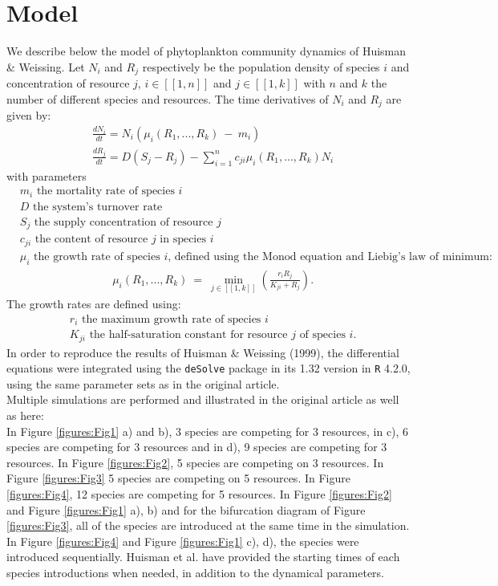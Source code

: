 \section{Model}
We describe below the model of phytoplankton community dynamics of Huisman \& Weissing\supercite{1999:Huisman}.
Let $N_i$ and $R_j$ respectively be the population density of species $i$ and concentration of resource 
$j$, $i\in[\![1,n]\!]$ and $j\in[\![1,k]\!]$ with $n$ and $k$ the number of 
different species and resources. The time derivatives of $N_i$ and $R_j$ are 
given by: \\
\begin{align}
	& \frac{dN_i}{dt}= N_i(\mu_i(R_1,...,R_k)~-~m_i)\\
	& \frac{dR_j}{dt}= D(S_j-R_j) - \sum_{i=1}^n c_{ji} 
\mu_i(R_1,...,R_k)N_i
\end{align}
with parameters
\begin{align*}
& m_i \text{ the mortality rate of species $i$}\\
& D \text{ the system's turnover rate}\\
& S_j \text{ the supply concentration of resource $j$}\\
& c_{ji} \text{ the content of resource $j$ in species $i$}\\
& \mu_i \text{ the growth rate of species $i$, defined using the Monod equation and Liebig's law of minimum: }
\end{align*}
\begin{align}
&\mu_i(R_1,...,R_k)~=~\min_{j\in[\![1,k]\!]}(\frac{r_iR_j}{K_{ji}+R_j}). 
\end{align}
The growth rates are defined using: 
\begin{align*}
&r_i \text{ the maximum growth rate of species $i$}\\
&K_{	ji} \text{ the half-saturation constant for resource $j$ of species $i$.}
\end{align*}
In order to reproduce the results of Huisman \& Weissing (1999), the differential 
equations were integrated using the \texttt{deSolve} package in its 1.32 version in \texttt{R} 4.2.0, using the same parameter sets as in the original article.\\

Multiple simulations are performed and illustrated in the original article as well as here: \\
In Figure \ref{figures:Fig1} a) and b), 3 species are competing for 3 resources, in c), 6 species are competing for 3 resources and in d), 9 species are competing for 3 resources. In Figure \ref{figures:Fig2}, 5 species are competing on 3 resources. In Figure \ref{figures:Fig3} 5 species are competing on 5 resources. In Figure \ref{figures:Fig4}, 12 species are competing for 5 resources. 
In Figure \ref{figures:Fig2} and Figure \ref{figures:Fig1} a), b) and for the 
bifurcation diagram of Figure \ref{figures:Fig3}, all of the species are 
introduced at the same time in the simulation. In Figure \ref{figures:Fig4} and 
Figure \ref{figures:Fig1} c), d), the species were introduced sequentially. 
Huisman et al.\supercite{1999:Huisman} have provided the starting times 
of each species introductions when needed, in addition to the dynamical parameters.\\


